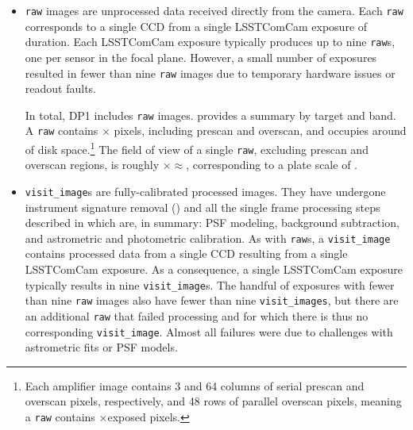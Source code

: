 \begin{itemize}
\item \texttt{raw} images \citep{10.71929/rubin/2570310} are unprocessed data received directly from the \gls{camera}.
Each \texttt{raw} corresponds to a single \gls{CCD} from a single \gls{LSSTComCam} exposure of \exposuretime duration.
Each \gls{LSSTComCam} exposure typically produces up to nine \texttt{raw}s, one per sensor in the focal plane.
However, a small number of exposures resulted in fewer than nine \texttt{raw} images due to temporary hardware issues or readout faults.

In total, \gls{DP1} includes \nraws \texttt{raw} images.
 provides a summary by target and band.
A \texttt{raw} contains \nrawpixx $\times$ \nrawpixy pixels, including prescan and overscan, and occupies around \rawhdd of disk space.\footnote{Each amplifier image contains 3 and 64 columns of serial prescan and overscan pixels, respectively, and 48 rows of parallel overscan pixels, meaning a \texttt{raw} contains \nvisitimagepixx$\times$\nvisitimagepixy exposed pixels.}
The field of view of a single \texttt{raw}, excluding prescan and overscan regions, is roughly \visitimagefovx$\times$\visitimagefovy$\approx$\visitimagefov, corresponding to a plate scale of \rawplatescale.






\item \texttt{visit\_image}s \citep{10.71929/rubin/2570311} are fully-calibrated processed images.
They have undergone instrument signature removal () and all the single frame processing steps described in  which are, in summary: \gls{PSF} modeling, \gls{background} subtraction, and astrometric and photometric \gls{calibration}.
As with \texttt{raw}s, a \texttt{visit\_image} contains processed data from a single \gls{CCD} resulting from a single \exposuretime \gls{LSSTComCam} exposure.
As a consequence, a single \gls{LSSTComCam} exposure typically results in nine \texttt{visit\_image}s.
The handful of exposures with fewer than nine \texttt{raw} images also have fewer than nine \texttt{visit\_images}, but there are an additional \nsfpfails \texttt{raw} that failed processing and for which there is thus no corresponding \texttt{visit\_image}. Almost all failures were due to challenges with astrometric fits or \gls{PSF} models.


\end{itemize}

